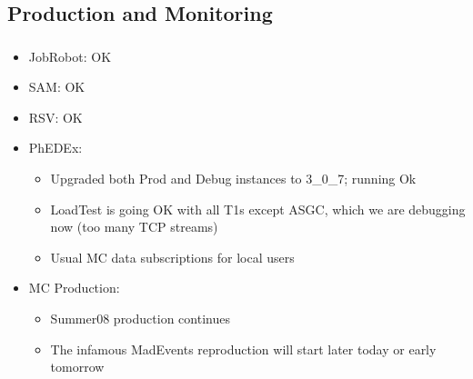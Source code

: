 \documentclass{beamer}
\begin{document}
\subsection{Production and Monitoring}
\begin{frame}
\frametitle{}
\begin{itemize}
     \item JobRobot: OK
     \item SAM: OK
     \item RSV: OK
     \item PhEDEx:
     \begin{itemize}
        \item Upgraded both Prod and Debug instances to 3\_0\_7; running Ok
        \item LoadTest is going OK with all T1s except ASGC, which we are debugging now (too many TCP streams)
        \item Usual MC data subscriptions for local users
     \end{itemize}
     \item MC Production:
     \begin{itemize}
        \item Summer08 production continues
        \item The infamous MadEvents reproduction will start later today or early tomorrow
     \end{itemize}
\end{itemize}
\end{frame}
\end{document}
